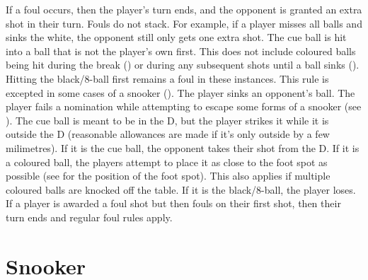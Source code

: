  If a foul occurs, then the player's turn ends, and the opponent is granted an extra shot in their turn.%
 Fouls do not stack. For example, if a player misses all balls and sinks the white, the opponent still only gets one extra shot.%
 \FoulCircumstances%
\subruleitem The cue ball is hit into a ball that is not the player's own first. This does not include coloured balls being hit during the break () or during any subsequent shots until a ball sinks (). Hitting the black/8-ball first remains a foul in these instances. This rule is excepted in some cases of a snooker ().%
\subruleitem \CueBallMiss%
\subruleitem \CueBallSink%
\subruleitem The player sinks an opponent's ball.%
\subruleitem \CueBallRail%
\subruleitem \CueBallPreemptive%
\subruleitem The player fails a nomination while attempting to escape some forms of a snooker (see ).%
\subruleitem The cue ball is meant to be in the D, but the player strikes it while it is outside the D (reasonable allowances are made if it's only outside by a few milimetres).%
\subruleitem \PushShot%
\subruleitem \ObjectBallTouch[8ball]%
\BallOffTable%
\subsubruleitem If it is the cue ball, the opponent takes their shot from the D.%
\subsubruleitem If it is a coloured ball, the players attempt to place it as close to the foot spot as possible (see  for the position of the foot spot). This also applies if multiple coloured balls are knocked off the table.%
\subsubruleitem If it is the black/8-ball, the player loses.%
\subruleitem \JumpShot%
\subruleitem \TableMovement%
\subruleitem \PoorBehaviour%
 If a player is awarded a foul shot but then fouls on their first shot, then their turn ends and regular foul rules apply.%
\IntentionalFoul%

\section{Snooker} \label{8ball:snooker}

